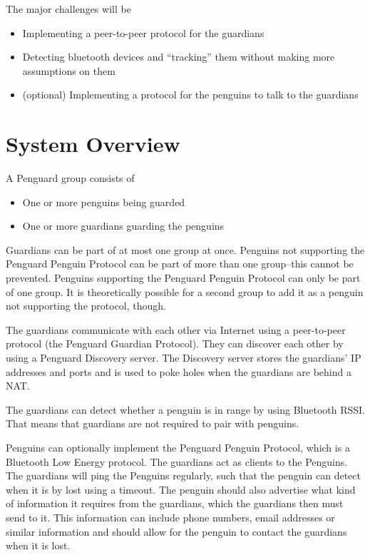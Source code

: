 \documentclass{report}
\begin{document}
The major challenges will be

\begin{itemize}
    \item Implementing a peer-to-peer protocol for the guardians
    \item Detecting bluetooth devices and ``tracking'' them without making more assumptions on them
    \item (optional) Implementing a protocol for the penguins to talk to the guardians
\end{itemize}

\section{System Overview}

A Penguard group consists of

\begin{itemize}
    \item One or more penguins being guarded
    \item One or more guardians guarding the penguins
\end{itemize}

Guardians can be part of at most one group at once. Penguins not supporting the Penguard Penguin Protocol can be part of more than one group--this cannot be prevented. Penguins supporting the Penguard Penguin Protocol can only be part of one group. It is theoretically possible for a second group to add it as a penguin not supporting the protocol, though.

The guardians communicate with each other via Internet using a peer-to-peer protocol (the Penguard Guardian Protocol). They can discover each other by using a Penguard Discovery server. The Discovery server stores the guardians' IP addresses and ports and is used to poke holes when the guardians are behind a NAT.

The guardians can detect whether a penguin is in range by using Bluetooth RSSI. That means that guardians are not required to pair with penguins.

Penguins can optionally implement the Penguard Penguin Protocol, which is a Bluetooth Low Energy protocol. The guardians act as clients to the Penguins. The guardians will ping the Penguins regularly, such that the penguin can detect when it is by lost using a timeout. The penguin should also advertise what kind of information it requires from the guardians, which the guardians then must send to it. This information can include phone numbers, email addresses or similar information and should allow for the penguin to contact the guardians when it is lost.
\end{document}
